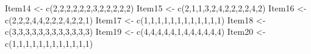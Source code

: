 \documentclass[
  english,
]{book}
\newenvironment{Shaded}{\begin{snugshade}}{\end{snugshade}}
\newcommand{\DecValTok}[1]{\textcolor[rgb]{0.00,0.00,0.81}{#1}}
\newcommand{\FunctionTok}[1]{\textcolor[rgb]{0.00,0.00,0.00}{#1}}
\newcommand{\NormalTok}[1]{#1}
\newcommand{\OtherTok}[1]{\textcolor[rgb]{0.56,0.35,0.01}{#1}}
\begin{document}
\begin{Shaded}
\begin{Highlighting}[]
\NormalTok{Item14 }\OtherTok{\textless{}{-}} \FunctionTok{c}\NormalTok{(}\DecValTok{2}\NormalTok{,}\DecValTok{2}\NormalTok{,}\DecValTok{2}\NormalTok{,}\DecValTok{2}\NormalTok{,}\DecValTok{2}\NormalTok{,}\DecValTok{2}\NormalTok{,}\DecValTok{3}\NormalTok{,}\DecValTok{2}\NormalTok{,}\DecValTok{2}\NormalTok{,}\DecValTok{2}\NormalTok{,}\DecValTok{2}\NormalTok{,}\DecValTok{2}\NormalTok{)}
\NormalTok{Item15 }\OtherTok{\textless{}{-}} \FunctionTok{c}\NormalTok{(}\DecValTok{2}\NormalTok{,}\DecValTok{1}\NormalTok{,}\DecValTok{1}\NormalTok{,}\DecValTok{3}\NormalTok{,}\DecValTok{2}\NormalTok{,}\DecValTok{4}\NormalTok{,}\DecValTok{2}\NormalTok{,}\DecValTok{2}\NormalTok{,}\DecValTok{2}\NormalTok{,}\DecValTok{2}\NormalTok{,}\DecValTok{4}\NormalTok{,}\DecValTok{2}\NormalTok{)}
\NormalTok{Item16 }\OtherTok{\textless{}{-}} \FunctionTok{c}\NormalTok{(}\DecValTok{2}\NormalTok{,}\DecValTok{2}\NormalTok{,}\DecValTok{2}\NormalTok{,}\DecValTok{4}\NormalTok{,}\DecValTok{4}\NormalTok{,}\DecValTok{2}\NormalTok{,}\DecValTok{2}\NormalTok{,}\DecValTok{2}\NormalTok{,}\DecValTok{4}\NormalTok{,}\DecValTok{2}\NormalTok{,}\DecValTok{2}\NormalTok{,}\DecValTok{1}\NormalTok{)}
\NormalTok{Item17 }\OtherTok{\textless{}{-}} \FunctionTok{c}\NormalTok{(}\DecValTok{1}\NormalTok{,}\DecValTok{1}\NormalTok{,}\DecValTok{1}\NormalTok{,}\DecValTok{1}\NormalTok{,}\DecValTok{1}\NormalTok{,}\DecValTok{1}\NormalTok{,}\DecValTok{1}\NormalTok{,}\DecValTok{1}\NormalTok{,}\DecValTok{1}\NormalTok{,}\DecValTok{1}\NormalTok{,}\DecValTok{1}\NormalTok{,}\DecValTok{1}\NormalTok{)}
\NormalTok{Item18 }\OtherTok{\textless{}{-}} \FunctionTok{c}\NormalTok{(}\DecValTok{3}\NormalTok{,}\DecValTok{3}\NormalTok{,}\DecValTok{3}\NormalTok{,}\DecValTok{3}\NormalTok{,}\DecValTok{3}\NormalTok{,}\DecValTok{3}\NormalTok{,}\DecValTok{3}\NormalTok{,}\DecValTok{3}\NormalTok{,}\DecValTok{3}\NormalTok{,}\DecValTok{3}\NormalTok{,}\DecValTok{3}\NormalTok{,}\DecValTok{3}\NormalTok{)}
\NormalTok{Item19 }\OtherTok{\textless{}{-}} \FunctionTok{c}\NormalTok{(}\DecValTok{4}\NormalTok{,}\DecValTok{4}\NormalTok{,}\DecValTok{4}\NormalTok{,}\DecValTok{4}\NormalTok{,}\DecValTok{4}\NormalTok{,}\DecValTok{1}\NormalTok{,}\DecValTok{4}\NormalTok{,}\DecValTok{4}\NormalTok{,}\DecValTok{4}\NormalTok{,}\DecValTok{4}\NormalTok{,}\DecValTok{4}\NormalTok{,}\DecValTok{4}\NormalTok{)}
\NormalTok{Item20 }\OtherTok{\textless{}{-}} \FunctionTok{c}\NormalTok{(}\DecValTok{1}\NormalTok{,}\DecValTok{1}\NormalTok{,}\DecValTok{1}\NormalTok{,}\DecValTok{1}\NormalTok{,}\DecValTok{1}\NormalTok{,}\DecValTok{1}\NormalTok{,}\DecValTok{1}\NormalTok{,}\DecValTok{1}\NormalTok{,}\DecValTok{1}\NormalTok{,}\DecValTok{1}\NormalTok{,}\DecValTok{1}\NormalTok{,}\DecValTok{1}\NormalTok{)}

\end{Highlighting}
\end{Shaded}
\end{document}
